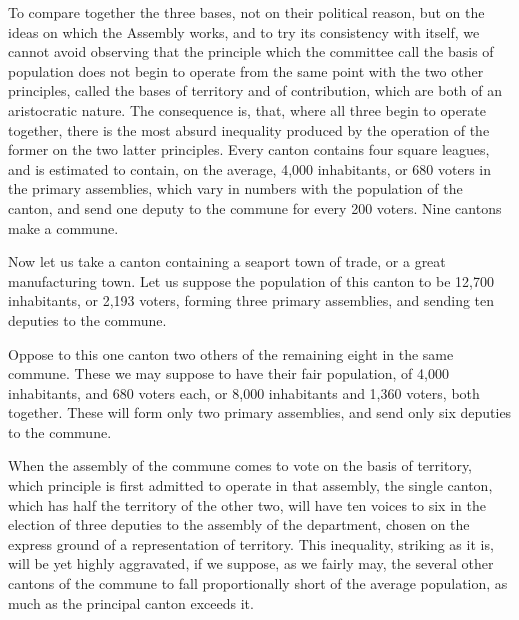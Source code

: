 To compare together the three bases, not on their political reason, but on the ideas on which the Assembly works, and to try its consistency with itself, we cannot avoid observing that the principle which the committee call the basis of population does not begin to operate from the same point with the two other principles, called the bases of territory and of contribution, which are both of an aristocratic nature. The consequence is, that, where all three begin to operate together, there is the most absurd inequality produced by the operation of the former on the two latter principles. Every canton contains four square leagues, and is estimated to contain, on the average, 4,000 inhabitants, or 680 voters in the primary assemblies, which vary in numbers with the population of the canton, and send one deputy to the commune for every 200 voters. Nine cantons make a commune.

Now let us take a canton containing a seaport town of trade, or a great manufacturing town. Let us suppose the population of this canton to be 12,700 inhabitants, or 2,193 voters, forming three primary assemblies, and sending ten deputies to the commune.

Oppose to this one canton two others of the remaining eight in the same commune. These we may suppose to have their fair population, of 4,000 inhabitants, and 680 voters each, or 8,000 inhabitants and 1,360 voters, both together. These will form only two primary assemblies, and send only six deputies to the commune.

When the assembly of the commune comes to vote on the basis of territory, which principle is first admitted to operate in that assembly, the single canton, which has half the territory of the other two, will have ten voices to six in the election of three deputies to the assembly of the department, chosen on the express ground of a representation of territory. This inequality, striking as it is, will be yet highly aggravated, if we suppose, as we fairly may, the several other cantons of the commune to fall proportionally short of the average population, as much as the principal canton exceeds it.

